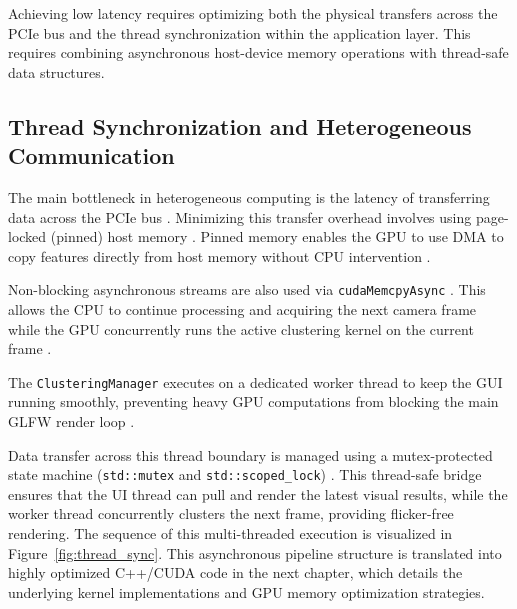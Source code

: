 \noindent\begin{minipage}{\linewidth}
Achieving low latency requires optimizing both the physical transfers across the PCIe bus and the thread synchronization within the application layer. This requires combining asynchronous host-device memory operations with thread-safe data structures.

\subsection{Thread Synchronization and Heterogeneous Communication}
The main bottleneck in heterogeneous computing is the latency of transferring data across the PCIe bus \cite{CudaGuide}. Minimizing this transfer overhead involves using page-locked (pinned) host memory \cite{CudaGuide, cook2012cuda}. Pinned memory enables the GPU to use DMA to copy features directly from host memory without CPU intervention \cite{CudaGuide}. 

Non-blocking asynchronous streams are also used via \texttt{cudaMemcpyAsync} \cite{CudaGuide}. This allows the CPU to continue processing and acquiring the next camera frame while the GPU concurrently runs the active clustering kernel on the current frame \cite{cook2012cuda}.

The \texttt{ClusteringManager} executes on a dedicated worker thread to keep the GUI running smoothly, preventing heavy GPU computations from blocking the main GLFW render loop \cite{GLFWdocs}. 

Data transfer across this thread boundary is managed using a mutex-protected state machine (\texttt{std::mutex} and \texttt{std::scoped\_lock}) \cite{williams2019c++}. This thread-safe bridge ensures that the UI thread can pull and render the latest visual results, while the worker thread concurrently clusters the next frame, providing flicker-free rendering. The sequence of this multi-threaded execution is visualized in Figure~\ref{fig:thread_sync}. This asynchronous pipeline structure is translated into highly optimized C++/CUDA code in the next chapter, which details the underlying kernel implementations and GPU memory optimization strategies.
\end{minipage}

